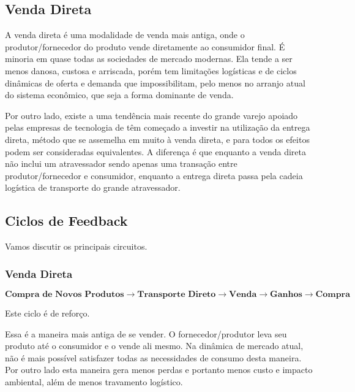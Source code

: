 \documentclass[]{article}
\begin{document}
	\subsection{Venda Direta}
	
	A venda direta é uma modalidade de venda mais antiga, onde o produtor/fornecedor do produto vende diretamente ao consumidor final. É minoria em quase todas as sociedades de mercado modernas. Ela tende a ser menos danosa, custosa e arriscada, porém tem limitações logísticas e de ciclos dinâmicas de oferta e demanda que impossibilitam, pelo menos no arranjo atual do sistema econômico, que seja a forma dominante de venda. 
	
	Por outro lado, existe a uma tendência mais recente do grande varejo apoiado pelas empresas de tecnologia de têm começado a investir na utilização da entrega direta, método que se assemelha em muito à venda direta, e para todos os efeitos podem ser consideradas equivalentes. A diferença é que enquanto a venda direta não inclui um atravessador sendo apenas uma transação entre produtor/fornecedor e consumidor, enquanto a entrega direta passa pela cadeia logística de transporte do grande atravessador.
	
	\newpage 
	
	
	\subsection{Ciclos de Feedback}
	
	Vamos discutir os principais circuitos. 
	
	\subsubsection{Venda Direta}
	\begin{center}
		$\textbf{Compra de Novos Produtos} \rightarrow \textbf{Transporte Direto} \rightarrow \textbf{Venda} \rightarrow \textbf{Ganhos} \rightarrow \textbf{Compra}$
	\end{center}
	
	Este ciclo é de reforço.
	
	Essa é a maneira mais antiga de se vender. O fornecedor/produtor leva seu produto até o consumidor e o vende ali mesmo. Na dinâmica de mercado atual, não é mais possível satisfazer todas as necessidades de consumo desta maneira. Por outro lado esta maneira gera menos perdas e portanto menos custo e impacto ambiental, além de menos travamento logístico.
	
\end{document}
